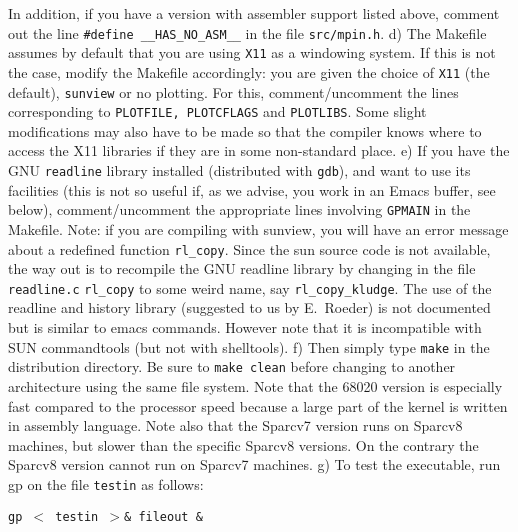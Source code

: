       In addition, if you have a version with assembler support listed above,
      comment out the line {\tt \#define \_\_HAS\_NO\_ASM\_\_} in the file
      {\tt src/mpin.h}.
\medskip
   d) The Makefile assumes by default that you are using {\tt X11} as a 
      windowing system. If this is not the case, modify the Makefile 
      accordingly: you are given the choice of {\tt X11} (the default), 
      {\tt sunview} or no plotting. For this, comment/uncomment the lines
      corresponding to {\tt PLOTFILE, PLOTCFLAGS} and {\tt PLOTLIBS}.
      Some slight modifications may also have to be made so that the compiler 
      knows where to access the X11 libraries if they are in some non-standard
      place.
\medskip
   e) If you have the GNU {\tt readline} library installed (distributed with
     {\tt gdb}), and want to use its facilities (this is not so useful if, as
      we advise, you work in an Emacs buffer, see below), comment/uncomment the
      appropriate lines involving {\tt GPMAIN} in the Makefile.
      Note: if you are compiling with sunview, you will have an error message
      about a redefined function {\tt rl\_copy}.
      Since the sun source code is not available, the way out is to recompile
      the GNU readline library by changing in the file {\tt readline.c}
      {\tt rl\_copy} to some weird name, say {\tt rl\_copy\_kludge}.
      The use of the readline and history library (suggested to us by 
      E.~Roeder) is not documented but is similar to emacs commands. However
      note that it is incompatible with SUN commandtools (but not with
      shelltools).
\medskip
   f) Then simply type {\tt make} in the distribution directory. Be sure to 
      {\tt make clean} before changing to another architecture using the same
      file system. Note that the 68020 version is especially fast compared
      to the processor speed because a large part of the kernel is written in
      assembly language.  Note also that the Sparcv7 version runs on Sparcv8
      machines, but slower than the specific Sparcv8 versions. On the contrary
      the Sparcv8 version cannot run on Sparcv7 machines.
\medskip
   g) To test the executable, run gp on the file {\tt testin} as follows:

\centerline{\tt gp $<$ testin $>$\& fileout \&}

